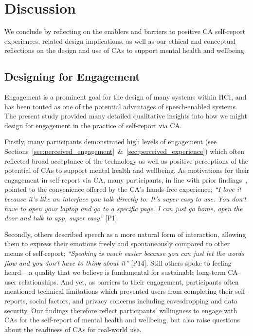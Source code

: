 




\section{Discussion}

    We conclude by reflecting on the enablers and barriers to positive \ac{CA} self-report experiences, related design implications, as well as our ethical and conceptual reflections on the design and use of \acp{CA} to support mental health and wellbeing.

    \subsection{Designing for Engagement}
    
        Engagement is a prominent goal for the design of many systems within \ac{HCI}, and has been touted as one of the potential advantages of speech-enabled systems. The present study provided many detailed qualitative insights into how we might design for engagement in the practice of self-report via \ac{CA}.
        
        Firstly, many participants demonstrated high levels of engagement (see Sections~\ref{sec:perceived_engagement}~\&~\ref{sec:perceived_experience}) which often reflected broad acceptance of the technology as well as positive perceptions of the potential of \acp{CA} to support mental health and wellbeing. As motivations for their engagement in self-report via \ac{CA}, many participants, in line with prior findings~\cite{lau2018alexa, Rafal2018Workplace}, pointed to the convenience offered by the \ac{CA}'s hands-free experience; \textit{``I love it because it’s like an interface you talk directly to. It’s super easy to use. You don’t have to open your laptop and go to a specific page. I can just go home, open the door and talk to \acl{app}, super easy''} [P1]. 

        Secondly, others described speech as a more natural form of interaction, allowing them to express their emotions freely and spontaneously compared to other means of self-report; \textit{``Speaking is much easier because you can just let the words flow and you don't have to think about it''} [P14]. Still others spoke to feeling heard -- a quality that we believe is fundamental for sustainable long-term \ac{CA}-user relationships. And yet, as barriers to their engagement, participants often mentioned technical limitations which prevented users from completing their self-reports, social factors, and privacy concerns including eavesdropping and data security. Our findings therefore reflect participants' willingness to engage with \acp{CA} for the self-report of mental health and wellbeing, but also raise questions about the readiness of \acp{CA} for real-world use. 
    
